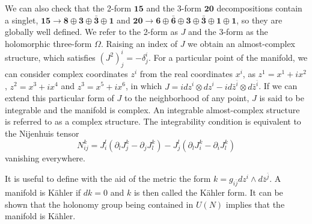 We can also check that the 2-form $\mathbf {15}$ and the 3-form $\mathbf{20}$ decompositions contain a singlet, 
$\mathbf {15}\to \mathbf 8\oplus \mathbf 3\oplus \bar {\mathbf 3}\oplus \mathbf 1$ and 
$\mathbf {20}\to \mathbf 6\oplus \bar{\mathbf 6}\oplus\mathbf 3\oplus \bar {\mathbf 3}\oplus \mathbf 1\oplus \mathbf 1$,
so they are globally well defined.
We refer to the 2-form as $J$ and the 3-form as the holomorphic three-form $\Omega$.
Raising an index of $J$ we obtain an almost-complex structure, which satisfies $(J^2)^i_j=-\delta^i_j$.
For a particular point of the manifold, we can consider  complex coordinates $z^i$ from the real coordinates $x^i$,
as $z^1=x^1+ix^2$, $z^2=x^3+ix^4$ and $z^3=x^5+ix^6$,
in which $J=idz^i\otimes dz^i - i d\bar z^{\bar i}\otimes d\bar z^{\bar i}$.
If we can extend this particular form of $J$ to the neighborhood of any point, $J$ is said to be integrable
and the manifold is complex.
An integrable almost-complex structure is referred to as a complex structure. 
The integrability condition is equivalent to the Nijenhuis tensor 
\begin{equation}
  N^k_{ij}= J^l_i(\partial_l J^k_j - \partial_j J^k_l) - J_j^l (\partial_l J^k_i - \partial_i J^k_l)
\end{equation}
vanishing everywhere.

It is useful to define with the aid of the metric the form $k=g_{i\bar j} dz^i \wedge d\bar z^{\bar j}$.
A manifold is Kähler if $dk=0$ and $k$ is then called the Kähler form.
It can be shown that the holonomy group being contained in $U(N)$ implies that the manifold is Kähler.

